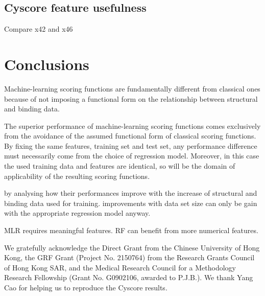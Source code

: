 \documentclass[journal=jacsat,manuscript=article]{achemso}
\begin{document}
\subsection{Cyscore feature usefulness}

Compare x42 and x46

\section{Conclusions}

Machine-learning scoring functions are fundamentally different from classical ones because of not imposing a functional form on the relationship between structural and binding data.

The superior performance of machine-learning scoring functions comes exclusively from the avoidance of the assumed functional form of classical scoring functions. By fixing the same features, training set and test set, any performance difference must necessarily come from the choice of regression model. Moreover, in this case the used training data and features are identical, so will be the domain of applicability of the resulting scoring functions. 

by analysing how their performances improve with the increase of structural and binding data used for training. improvements with data set size can only be gain with the appropriate regression model anyway.

MLR requires meaningful features. RF can benefit from more numerical features.

\begin{acknowledgement}

We gratefully acknowledge the Direct Grant from the Chinese University of Hong Kong, the GRF Grant (Project No. 2150764) from the Research Grants Council of Hong Kong SAR, and the Medical Research Council for a Methodology Research Fellowship (Grant No. G0902106, awarded to P.J.B.). We thank Yang Cao for helping us to reproduce the Cyscore results.

\end{acknowledgement}

\begin{suppinfo}



\end{suppinfo}


\end{document}

